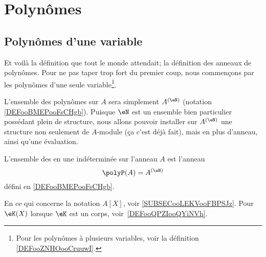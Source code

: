 
\section{Polynômes}

\subsection{Polynômes d'une variable}

Et voilà la définition que tout le monde attendait; la définition des anneaux de polynômes. Pour ne pas taper trop fort du premier coup, nous commençons par les polynômes d'une seule variable\footnote{Pour les polynômes à plusieurs variables, voir la définition \ref{DEFooZNHOooCruuwI}.}.


L'ensemble des polynômes sur \( A\) sera simplement \( A^{(\eN)}\) (notation \ref{DEFooBMEPooFsCHgb}). Puisque \( \eN\) est un ensemble bien particulier possédant plein de structure, nous allons pouvoir installer sur \( A^{(\eN)}\) une structure non seulement de \( A\)-module (ça c'est déjà fait), mais en plus d'anneau, ainsi qu'une évaluation.
\begin{definition}      \label{DEFooFYZRooMikwEL}
	L'ensemble des  en une indéterminée sur l'anneau \( A\) est l'anneau
	\begin{equation}
		\polyP(A)=A^{(\eN)}
	\end{equation}
	défini en \ref{DEFooBMEPooFsCHgb}.
\end{definition}

\begin{normaltext}
	En ce qui concerne la notation \( A[X]\), voir \ref{SUBSECooLEKVooFBPSJz}. Pour \( \eK(X)\) lorsque \( \eK\) est un corps, voir~\ref{DEFooQPZIooQYiNVh}.
\end{normaltext}

